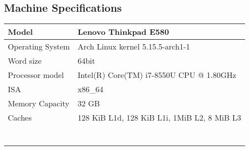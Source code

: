\begin{appendices}
\section{Machine Specifications}
\label{appendix:machine-specs}
\begin{table}[H]
\begin{tabular}{ll}
\hline
\multicolumn{1}{|l|}{Model}            & \multicolumn{1}{l|}{Lenovo Thinkpad E580}                        \\ \hline
\multicolumn{1}{|l|}{Operating System} & \multicolumn{1}{l|}{Arch Linux kernel 5.15.5-arch1-1}            \\ \hline
\multicolumn{1}{|l|}{Word size}        & \multicolumn{1}{l|}{64bit}                                       \\ \hline
\multicolumn{1}{|l|}{Processor model}  & \multicolumn{1}{l|}{Intel(R) Core(TM) i7-8550U CPU @ 1.80GHz}    \\ \hline
\multicolumn{1}{|l|}{ISA}              & \multicolumn{1}{l|}{x86\_64}                                     \\ \hline
\multicolumn{1}{|l|}{Memory Capacity}              & \multicolumn{1}{l|}{32 GB}                                     \\ \hline
\multicolumn{1}{|l|}{Caches}           & \multicolumn{1}{l|}{128 KiB L1d, 128 KiB L1i, 1MiB L2, 8 MiB L3} \\ \hline
                                       &                                                                  \\
                                       &                                                                  \\
                                       &                                                                  \\
                                       &                                                                  \\
                                       &                                                                  \\
                                       &                                                                  \\
                                       &                                                                 
\end{tabular}
\end{table}
\end{appendices}
